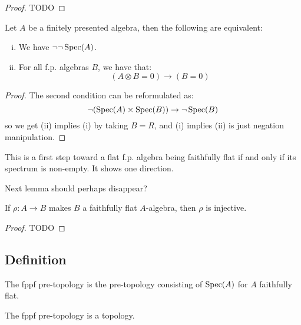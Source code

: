 \begin{proof}
TODO
\end{proof}

\begin{lemma}
Let $A$ be a finitely presented algebra, then the following are equivalent:
\begin{enumerate}[(i)]
\item We have $\neg\neg\operatorname{Spec}(A)$.
\item For all f.p. algebras $B$, we have that:
\[(A\otimes B = 0) \to (B=0)\]
\end{enumerate}
\end{lemma}

\begin{proof}
The second condition can be reformulated as:
\[\neg(\operatorname{Spec}(A)\times\operatorname{Spec}(B))\to \neg\operatorname{Spec}(B)\]
so we get (ii) implies (i) by taking $B=R$, and (i) implies (ii) is just negation manipulation.
\end{proof}

This is a first step toward a flat f.p. algebra being faithfully flat if and only if its spectrum is non-empty. It shows one direction.

Next lemma should perhaps disappear?

\begin{lemma}
If $\rho: A\to B$ makes $B$ a faithfully flat $A$-algebra, then $\rho$ is injective.
\end{lemma}

\begin{proof}
TODO
\end{proof}

\subsection{Definition}

\begin{definition}
The fppf pre-topology is the pre-topology consisting of $\operatorname{Spec}(A)$ for $A$ faithfully flat.
\end{definition}

\begin{lemma}
The fppf pre-topology is a topology.
\end{lemma}

